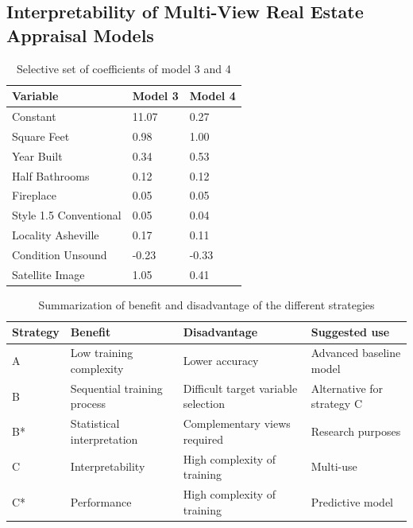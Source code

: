 \documentclass[letterpaper]{article} %
\begin{document}
\subsection{Interpretability of Multi-View Real Estate Appraisal Models}

\begin{table}[b]
    \centering
    \begin{tabular}{|l|l|l|}
    \hline
        \textbf{Variable} & \textbf{Model 3} & \textbf{Model 4} \\ \hline
         Constant & 11.07 & 0.27 \\
         Square Feet  & 0.98  & 1.00 \\
         Year Built  & 0.34 & 0.53 \\
         Half Bathrooms   & 0.12 & 0.12 \\
         Fireplace & 0.05 & 0.05 \\
         Style 1.5 Conventional & 0.05 & 0.04 \\
         Locality Asheville & 0.17 & 0.11 \\
         Condition Unsound & -0.23 & -0.33 \\
         \hline
         Satellite Image  & 1.05 &  0.41 \\
         \hline
    \end{tabular}
    \caption{Selective set of coefficients of model 3 and 4}
    \label{tab:coefficients}
\end{table}

\begin{table}[t]
    \centering
    \begin{tabular}{|l|l|l|l|}
    \hline
        \textbf{Strategy} & \textbf{Benefit} & \textbf{Disadvantage} & \textbf{Suggested use} \\ \hline
  A & Low training complexity & Lower accuracy & Advanced baseline model \\ \hline
         B & Sequential training process & Difficult target variable selection & Alternative for strategy C \\ \hline
 B* & Statistical interpretation & Complementary views required & Research purposes \\ \hline
         C & Interpretability & High complexity of training & Multi-use \\  \hline
 C* & Performance & High complexity of training & Predictive model \\
         \hline
    \end{tabular}
    \caption{Summarization of benefit and disadvantage of the different strategies}
   \label{tab:strength}
\end{table}
\end{document}
